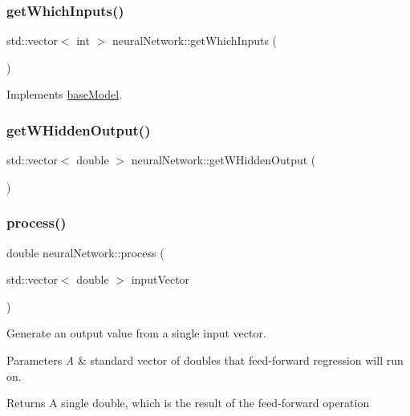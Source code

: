 \subsubsection{\texorpdfstring{get\+Which\+Inputs()}{getWhichInputs()}}
{\footnotesize\ttfamily std\+::vector$<$ int $>$ neural\+Network\+::get\+Which\+Inputs (\begin{DoxyParamCaption}{ }\end{DoxyParamCaption})\hspace{0.3cm}{\ttfamily [virtual]}}



Implements \hyperlink{classbase_model_a5d6b7579536f5713eed0b7b4a6687a16}{base\+Model}.

\mbox{\label{classneural_network_ac372190f6eabf0af27e5c317f2a1d51b}} 
\subsubsection{\texorpdfstring{get\+W\+Hidden\+Output()}{getWHiddenOutput()}}
{\footnotesize\ttfamily std\+::vector$<$ double $>$ neural\+Network\+::get\+W\+Hidden\+Output (\begin{DoxyParamCaption}{ }\end{DoxyParamCaption})}

\mbox{\label{classneural_network_a2da76293dbe590594e79e96768c02a29}} 
\subsubsection{\texorpdfstring{process()}{process()}}
{\footnotesize\ttfamily double neural\+Network\+::process (\begin{DoxyParamCaption}\item[{std\+::vector$<$ double $>$}]{input\+Vector }\end{DoxyParamCaption})\hspace{0.3cm}{\ttfamily [virtual]}}

Generate an output value from a single input vector. 
\begin{DoxyParams}{Parameters}
{\em A} & standard vector of doubles that feed-\/forward regression will run on. \\
\hline
\end{DoxyParams}
\begin{DoxyReturn}{Returns}
A single double, which is the result of the feed-\/forward operation 
\end{DoxyReturn}


